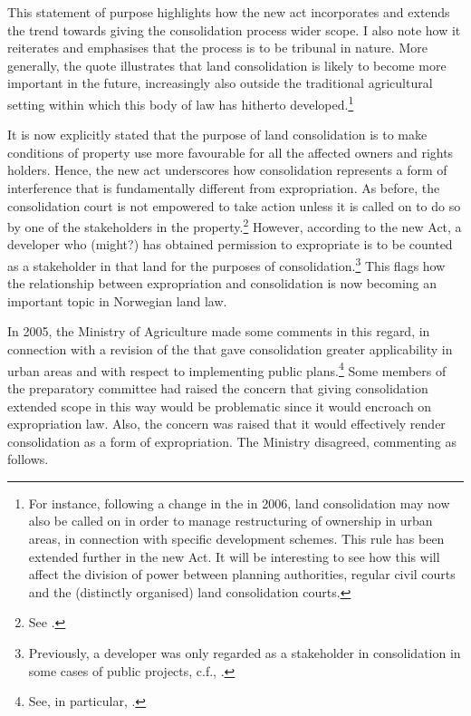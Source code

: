 This statement of purpose highlights how the new act incorporates and extends the trend towards giving the consolidation process wider scope. I also note how it reiterates and emphasises that the process is to be tribunal in nature. More generally, the quote illustrates that land consolidation is likely to become more important in the future, increasingly also outside the traditional agricultural setting within which this body of law has hitherto developed.\footnote{For instance, following a change in the \cite{lca79} in 2006, land consolidation may now also be called on in order to manage restructuring of ownership in urban areas, in connection with specific development schemes. This rule has been extended further in the new Act. It will be interesting to see how this will affect the division of power between planning authorities, regular civil courts and the (distinctly organised) land consolidation courts.}

It is now explicitly stated that the purpose of land consolidation is to make conditions of property use more favourable for all the affected owners and rights holders. Hence, the new act underscores how consolidation represents a form of interference that is fundamentally different from expropriation. As before, the consolidation court is not empowered to take action unless it is called on to do so by one of the stakeholders in the property.\footnote{See \cite[1-5]{lca13}.} However, according to the new Act, a developer who (might?) has obtained permission to expropriate is to be counted as a stakeholder in that land for the purposes of consolidation.\footnote{Previously, a developer was only regarded as a stakeholder in consolidation in some cases of public projects, c.f., \cite[5|88|88 a)]{lca79}.} This flags how the relationship between expropriation and consolidation is now becoming an important topic in Norwegian land law.

In 2005, the Ministry of Agriculture made some comments in this regard, in connection with a revision of the \cite{lca79} that gave consolidation greater applicability in urban areas and with respect to implementing public plans.\footnote{See, in particular, \cite[2 h-i)]{lca79}.} Some members of the preparatory committee had raised the concern that giving consolidation extended scope in this way would be problematic since it would encroach on expropriation law. Also, the concern was raised that it would effectively render consolidation as a form of expropriation. The Ministry disagreed, commenting as follows.

